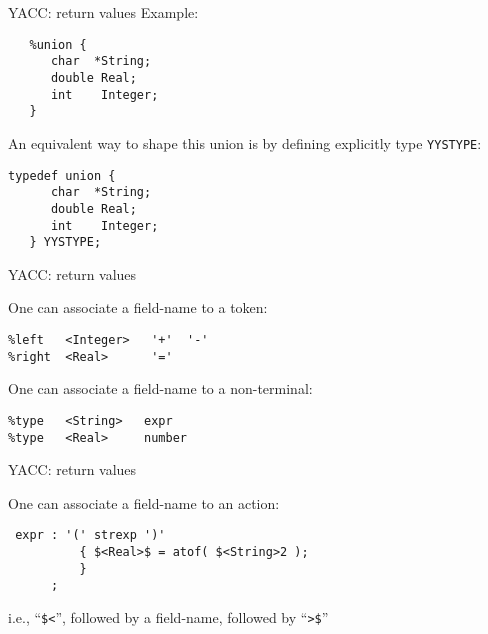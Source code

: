 \begin{frame}[fragile]{YACC: return values}
Example:



\vspace{20pt}

\begin{verbatim}
   %union {
      char  *String;
      double Real;
      int    Integer;
   }
\end{verbatim}


\vspace{20pt}

An equivalent way to shape this union is by defining explicitly type
{\tt YYSTYPE}:

\begin{verbatim}
typedef union {
      char  *String;
      double Real;
      int    Integer;
   } YYSTYPE;
\end{verbatim}



\end{frame}
\begin{frame}[fragile]{YACC: return values}

One can associate a field-name to a token:


\vspace{20pt}

\begin{verbatim}
%left   <Integer>   '+'  '-'
%right  <Real>      '='
\end{verbatim}


\vspace{20pt}

One can associate a field-name to a non-terminal:


\vspace{20pt}

\begin{verbatim}
%type   <String>   expr
%type   <Real>     number
\end{verbatim}


\end{frame}
\begin{frame}[fragile]{YACC: return values}

One can associate a field-name to an action:
 

\vspace{20pt}

\begin{verbatim}
 expr : '(' strexp ')'
          { $<Real>$ = atof( $<String>2 );
          }
      ;
\end{verbatim}


\vspace{20pt}

\noindent
i.e.,  ``\verb"$<"'', followed by a field-name, followed by  ``\verb">$"''


\end{frame}
